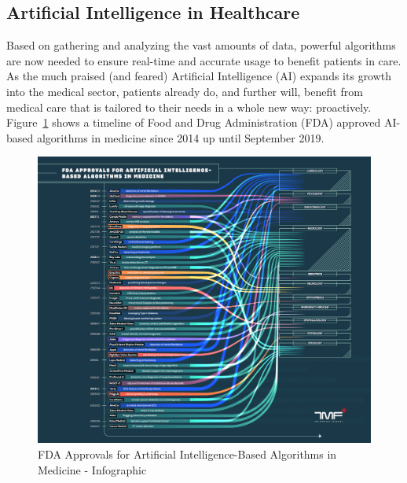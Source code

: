 \subsection{Artificial Intelligence in Healthcare}
\label{sec:AIinHC}
Based on gathering and analyzing the vast amounts of data, powerful algorithms are now needed to ensure real-time and accurate usage to benefit patients in care. As the much praised (and feared) Artificial Intelligence (AI) expands its growth into the medical sector, patients already do, and further will, benefit from medical care that is tailored to their needs in a whole new way: proactively. Figure~\ref{fig:FDA_AI_Info} shows a timeline of Food and Drug Administration (FDA) approved AI-based algorithms in medicine since 2014 up until September 2019.
\begin{figure}[htp]
    \centering
    \includegraphics[width=\textwidth]{media/The-Medical-Futurist-FDA-approved-AI-algorithms-in-medicine-2019-09.png}
    \caption{FDA Approvals for Artificial Intelligence-Based Algorithms in Medicine - Infographic \cite{fdaAi}}%
    \label{fig:FDA_AI_Info}
\end{figure}
